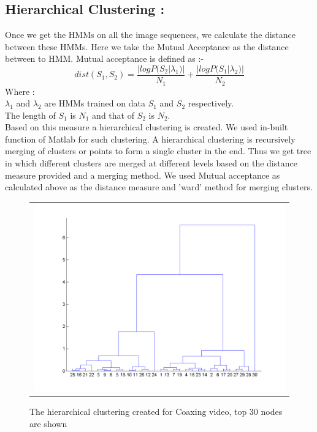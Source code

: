 \def\DevnagVersion{2.15}\documentclass[a4paper, 11pt, notitlepage]{report}
\begin{document}
\subsection{Hierarchical Clustering :}
Once we get the HMMs on all the image sequences, we calculate the distance between these HMMs. Here we take the Mutual Acceptance as the distance between to HMM. Mutual acceptance is defined as :-\\

$$dist(S_1, S_2) = \frac{|logP(S_2|\lambda _ 1)|}{N_1} +\frac{|logP(S_1|\lambda _ 2)|}{N_2} $$
Where : \\
\hspace*{20pt} $\lambda_1$ and $\lambda_2$ are HMMs trained on data $S_1$ and $S_2$ respectively.\\
\hspace*{20pt} The length of $S_1$ is $N_1$ and that of $S_2$ is $N_2$.\\

Based on this measure a hierarchical clustering is created. We used in-built function of Matlab for such clustering. A hierarchical clustering is recursively merging of clusters or points to form a single cluster in the end. Thus we get tree in which different clusters are merged at different levels based on the distance measure provided and a merging method. We used Mutual acceptance as calculated above as the distance measure and 'ward' method for merging clusters.

\begin{figure}[h]
\center
\begin{tabular}{c}
\includegraphics[scale=0.30]{dendoCoax.png}
\end{tabular}
\label{tab:gt}
\caption{The hierarchical clustering created for Coaxing video, top 30 nodes are shown}
\end{figure} 
 
\end{document}
